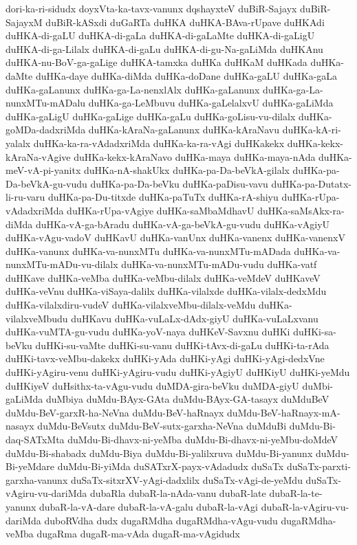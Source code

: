 {dori-ka-ri-sidudx
doyxVta-ka-tavx-vanunx
dqshayxteV
duBiR-Sajayx
duBiR-SajayxM
duBiR-kASxdi
duGaRTa
duHKA
duHKA-BAva-rUpave
duHKAdi
duHKA-di-gaLU
duHKA-di-gaLa
duHKA-di-gaLaMte
duHKA-di-gaLigU
duHKA-di-ga-Lilalx
duHKA-di-gaLu
duHKA-di-gu-Na-gaLiMda
duHKAnu
duHKA-nu-BoV-ga-gaLige
duHKA-tamxka
duHKa
duHKaM
duHKada
duHKa-daMte
duHKa-daye
duHKa-diMda
duHKa-doDane
duHKa-gaLU
duHKa-gaLa
duHKa-gaLanunx
duHKa-ga-La-nenxlAlx
duHKa-gaLanunx
duHKa-ga-La-nunxMTu-mADalu
duHKa-ga-LeMbuvu
duHKa-gaLelalxvU
duHKa-gaLiMda
duHKa-gaLigU
duHKa-gaLige
duHKa-gaLu
duHKa-goLisu-vu-dilalx
duHKa-goMDa-dadxriMda
duHKa-kAraNa-gaLanunx
duHKa-kAraNavu
duHKa-kA-ri-yalalx
duHKa-ka-ra-vAdadxriMda
duHKa-ka-ra-vAgi
duHKakekx
duHKa-kekx-kAraNa-vAgive
duHKa-kekx-kAraNavo
duHKa-maya
duHKa-maya-nAda
duHKa-meV-vA-pi-yanitx
duHKa-nA-shakUkx
duHKa-pa-Da-beVkA-gilalx
duHKa-pa-Da-beVkA-gu-vudu
duHKa-pa-Da-beVku
duHKa-paDisu-vavu
duHKa-pa-Dutatx-li-ru-varu
duHKa-pa-Du-titxde
duHKa-paTuTx
duHKa-rA-shiyu
duHKa-rUpa-vAdadxriMda
duHKa-rUpa-vAgiye
duHKa-saMbaMdhavU
duHKa-saMsAkx-ra-diMda
duHKa-vA-ga-bAradu
duHKa-vA-ga-beVkA-gu-vudu
duHKa-vAgiyU
duHKa-vAgu-vadoV
duHKavU
duHKa-vanUnx
duHKa-vanenx
duHKa-vanenxV
duHKa-vanunx
duHKa-va-nunxMTu
duHKa-va-nunxMTu-mADada
duHKa-va-nunxMTu-mADu-vu-dilalx
duHKa-va-nunxMTu-mADu-vudu
duHKa-vatf
duHKave
duHKa-veMba
duHKa-veMbu-dilalx
duHKa-veMdeV
duHKaveV
duHKa-veVnu
duHKa-viSaya-dalilx
duHKa-vilalxde
duHKa-vilalx-dedxMdu
duHKa-vilalxdiru-vudeV
duHKa-vilalxveMbu-dilalx-veMdu
duHKa-vilalxveMbudu
duHKavu
duHKa-vuLaLx-dAdx-giyU
duHKa-vuLaLxvanu
duHKa-vuMTA-gu-vudu
duHKa-yoV-naya
duHKeV-Savxnu
duHKi
duHKi-sa-beVku
duHKi-su-vaMte
duHKi-su-vanu
duHKi-tAvx-di-gaLu
duHKi-ta-rAda
duHKi-tavx-veMbu-dakekx
duHKi-yAda
duHKi-yAgi
duHKi-yAgi-dedxVne
duHKi-yAgiru-venu
duHKi-yAgiru-vudu
duHKi-yAgiyU
duHKiyU
duHKi-yeMdu
duHKiyeV
duHsithx-ta-vAgu-vudu
duMDA-gira-beVku
duMDA-giyU
duMbi-gaLiMda
duMbiya
duMdu-BAyx-GAta
duMdu-BAyx-GA-tasayx
duMduBeV
duMdu-BeV-garxR-ha-NeVna
duMdu-BeV-haRnayx
duMdu-BeV-haRnayx-mA-nasayx
duMdu-BeVsutx
duMdu-BeV-sutx-garxha-NeVna
duMduBi
duMdu-Bi-daq-SATxMta
duMdu-Bi-dhavx-ni-yeMba
duMdu-Bi-dhavx-ni-yeMbu-doMdeV
duMdu-Bi-shabadx
duMdu-Biya
duMdu-Bi-yalilxruva
duMdu-Bi-yanunx
duMdu-Bi-yeMdare
duMdu-Bi-yiMda
duSATxrX-payx-vAdadudx
duSaTx
duSaTx-parxti-garxha-vanunx
duSaTx-sitxrXV-yAgi-dadxlilx
duSaTx-vAgi-de-yeMdu
duSaTx-vAgiru-vu-dariMda
dubaRla
dubaR-la-nAda-vanu
dubaR-late
dubaR-la-te-yanunx
dubaR-la-vA-dare
dubaR-la-vA-galu
dubaR-la-vAgi
dubaR-la-vAgiru-vu-dariMda
duboRVdha
dudx
dugaRMdha
dugaRMdha-vAgu-vudu
dugaRMdha-veMba
dugaRma
dugaR-ma-vAda
dugaR-ma-vAgidudx
}
